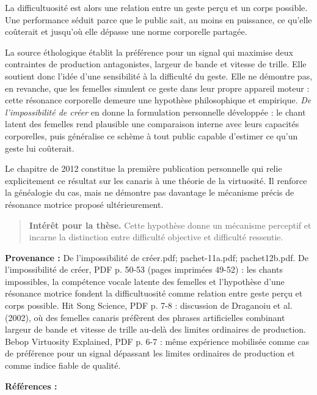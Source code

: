 \documentclass[10pt,a4paper]{article}
\begin{document}
La difficultuosité est alors une relation entre un geste perçu et un corps possible. Une performance séduit parce que le public sait, au moins en puissance, ce qu'elle coûterait et jusqu'où elle dépasse une norme corporelle partagée.

La source éthologique établit la préférence pour un signal qui maximise deux contraintes de production antagonistes, largeur de bande et vitesse de trille. Elle soutient donc l'idée d'une sensibilité à la difficulté du geste. Elle ne démontre pas, en revanche, que les femelles simulent ce geste dans leur propre appareil moteur : cette résonance corporelle demeure une hypothèse philosophique et empirique. \emph{De l'impossibilité de créer} en donne la formulation personnelle développée : le chant latent des femelles rend plausible une comparaison interne avec leurs capacités corporelles, puis généralise ce schème à tout public capable d'estimer ce qu'un geste lui coûterait.

Le chapitre de 2012 constitue la première publication personnelle qui relie explicitement ce résultat sur les canaris à une théorie de la virtuosité. Il renforce la généalogie du cas, mais ne démontre pas davantage le mécanisme précis de résonance motrice proposé ultérieurement.

\begin{quote}
\textbf{Intérêt pour la thèse.} Cette hypothèse donne un mécanisme perceptif et incarne la distinction entre difficulté objective et difficulté ressentie.
\end{quote}
{\footnotesize\color{metadata}\textbf{Provenance :} De l'impossibilité de créer.pdf; pachet-11a.pdf; pachet12b.pdf. De l'impossibilité de créer, PDF p. 50-53 (pages imprimées 49-52) : les chants impossibles, la compétence vocale latente des femelles et l'hypothèse d'une résonance motrice fondent la difficultuosité comme relation entre geste perçu et corps possible. Hit Song Science, PDF p. 7-8 : discussion de Draganoiu et al. (2002), où des femelles canaris préfèrent des phrases artificielles combinant largeur de bande et vitesse de trille au-delà des limites ordinaires de production. Bebop Virtuosity Explained, PDF p. 6-7 : même expérience mobilisée comme cas de préférence pour un signal dépassant les limites ordinaires de production et comme indice fiable de qualité.\par}
{\footnotesize\color{metadata}\textbf{Références :} \parencite{pachet2026impossibilite,pachet2011hitsong,pachet2012virtuosity}\par}
\end{document}
